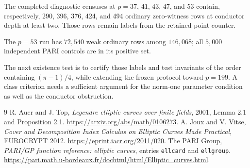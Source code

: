 \documentclass[11pt]{article}
\begin{document}
The completed diagnostic censuses at $p=37$, $41$, $43$, $47$, and $53$
contain, respectively, 290, 396, 376, 424, and 494 ordinary zero-witness
rows at conductor depth at least two. Those rows remain labels from the
retained point counter.

The $p=53$ run has $72{,}540$ weak ordinary rows among $146{,}068$;
all $5{,}000$ independent PARI controls are in its positive set.

The next existence test is to certify those labels and test invariants
of the order containing $(\pi-1)/4$, while extending the frozen
protocol toward $p=199$. A class criterion needs a sufficient argument
for the norm-one parameter condition as well as the conductor obstruction.

\begingroup\sloppy
\begin{thebibliography}{9}
 R. Auer and J. Top, \emph{Legendre elliptic curves
over finite fields}, 2001, Lemma 2.1 and Proposition 2.1.
\url{https://arxiv.org/abs/math/0106273}.
 A. Joux and V. Vitse, \emph{Cover and Decomposition Index
Calculus on Elliptic Curves Made Practical}, EUROCRYPT 2012.
\url{https://eprint.iacr.org/2011/020}.
 The PARI Group, \emph{PARI/GP function reference:
elliptic curves}, entries \texttt{ellcard} and \texttt{ellgroup}.
\url{https://pari.math.u-bordeaux.fr/dochtml/html/Elliptic_curves.html}.
\end{thebibliography}
\endgroup
\end{document}

